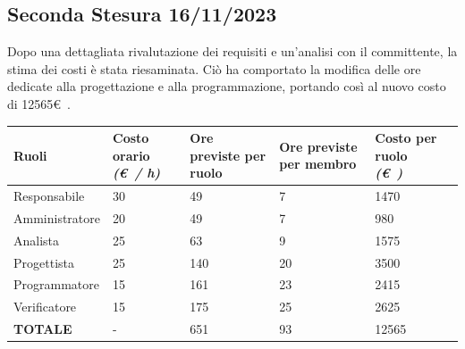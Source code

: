 \documentclass{article}
\begin{document}
\subsection{Seconda Stesura 16/11/2023}
Dopo una dettagliata rivalutazione dei requisiti e un'analisi con il committente, la stima dei costi è stata riesaminata. Ciò ha comportato la modifica delle ore dedicate alla progettazione e alla programmazione, portando così al nuovo costo di 12565\euro\ .
\begin{center}

    \begin{tabular}{|C{3cm}|C{2cm}|C{2cm}|C{2cm}|C{2cm}|C{2cm}|}
        \hline

        \textbf{Ruoli}  & \textbf{Costo orario} \linebreak \textit{(\euro\ / h)} & \textbf{Ore previste per ruolo} & \textbf{Ore previste per membro} & \textbf{Costo per ruolo} \linebreak \textit{(\euro\ )} \\
        \hline\hline

        Responsabile    & 30                                                     & 49                              & 7                                & 1470                                                   \\
        \hline

        Amministratore  & 20                                                     & 49                              & 7                                & 980                                                    \\
        \hline

        Analista        & 25                                                     & 63                              & 9                                & 1575                                                   \\
        \hline

        Progettista     & 25                                                     & 140                             & 20                               & 3500                                                   \\
        \hline

        Programmatore   & 15                                                     & 161                             & 23                               & 2415                                                   \\
        \hline

        Verificatore    & 15                                                     & 175                             & 25                               & 2625                                                   \\
        \hline\hline

        \textbf{TOTALE} & -                                                      & 651                             & 93                               & 12565                                                  \\
        \hline
    \end{tabular}
\end{center}
\end{document}
